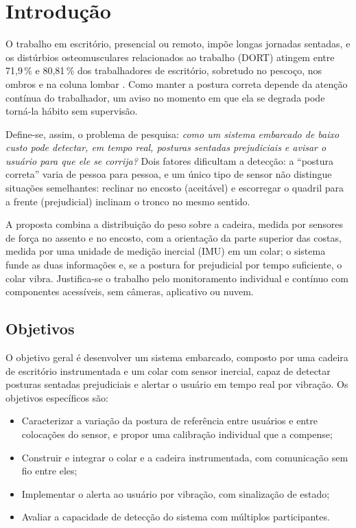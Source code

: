 \chapter{Introdução}\label{cap:introducao}

O trabalho em escritório, presencial ou remoto, impõe longas jornadas
sentadas, e os distúrbios osteomusculares relacionados ao trabalho (DORT)
atingem entre 71,9\,\% e 80,81\,\% dos trabalhadores de escritório,
sobretudo no pescoço, nos ombros e na coluna lombar
\cite{okezue2020,mohammadian2025}. Como manter a postura correta depende da
atenção contínua do trabalhador, um aviso no momento em que ela se degrada
pode torná-la hábito sem supervisão.

Define-se, assim, o problema de pesquisa: \emph{como um sistema embarcado de
baixo custo pode detectar, em tempo real, posturas sentadas prejudiciais e
avisar o usuário para que ele se corrija?} Dois fatores dificultam a
detecção: a ``postura correta'' varia de pessoa para pessoa, e um único tipo
de sensor não distingue situações semelhantes: reclinar no encosto
(aceitável) e escorregar o quadril para a frente (prejudicial) inclinam o
tronco no mesmo sentido.

A proposta combina a distribuição do peso sobre a cadeira, medida por
sensores de força no assento e no encosto, com a orientação da parte superior
das costas, medida por uma unidade de medição inercial (IMU) em um colar; o sistema funde as duas informações e, se a postura for prejudicial por tempo
suficiente, o colar vibra. Justifica-se o trabalho pelo monitoramento
individual e contínuo com componentes acessíveis, sem câmeras, aplicativo ou
nuvem.

\section{Objetivos}

O objetivo geral é desenvolver um sistema embarcado, composto por uma
cadeira de escritório instrumentada e um colar com sensor inercial, capaz de
detectar posturas sentadas prejudiciais e alertar o usuário em tempo real por
vibração. Os objetivos específicos são:

\begin{itemize}
  \setlength{\itemsep}{0pt}
  \setlength{\parsep}{0pt}
  \item Caracterizar a variação da postura de referência entre
        usuários e entre colocações do sensor, e propor uma calibração
        individual que a compense;
  \item Construir e integrar o colar e a cadeira instrumentada,
        com comunicação sem fio entre eles;
  \item Implementar o alerta ao usuário por vibração, com
        sinalização de estado;
  \item Avaliar a capacidade de detecção do sistema com
        múltiplos participantes.
\end{itemize}
